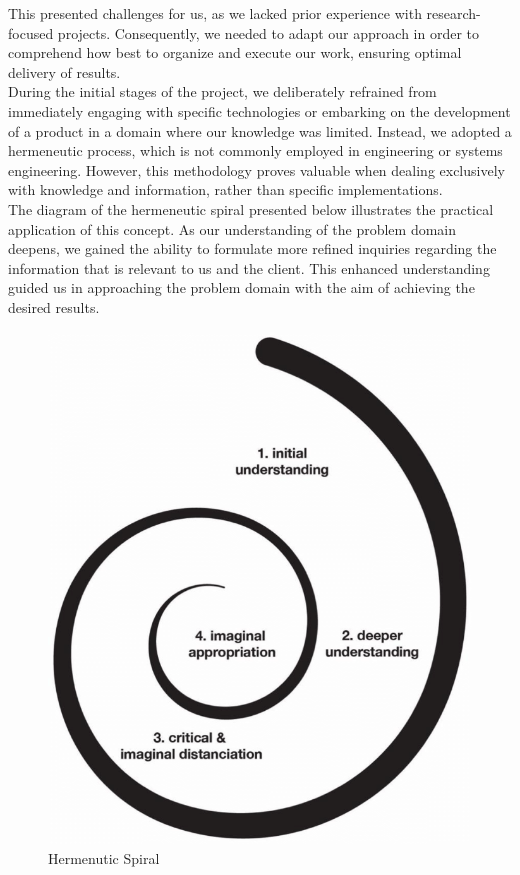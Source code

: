 This presented challenges for us, as we lacked prior experience with research-focused projects. Consequently, we needed to adapt our approach in order to comprehend how best to organize and execute our work, ensuring optimal delivery of results.\\

During the initial stages of the project, we deliberately refrained from immediately engaging with specific technologies or embarking on the development of a product in a domain where our knowledge was limited. Instead, we adopted a hermeneutic process, which is not commonly employed in engineering or systems engineering. However, this methodology proves valuable when dealing exclusively with knowledge and information, rather than specific implementations.\cite{Dialektikk} \\

The diagram of the hermeneutic spiral presented below illustrates the practical application of this concept. As our understanding of the problem domain deepens, we gained the ability to formulate more refined inquiries regarding the information that is relevant to us and the client. This enhanced understanding guided us in approaching the problem domain with the aim of achieving the desired results.\\

\begin{figure}[h]
    \centering
    \includegraphics[scale=0.5]{fig/HS.png}
    \caption{Hermenutic Spiral \cite{hermeneutics}}
\end{figure}

